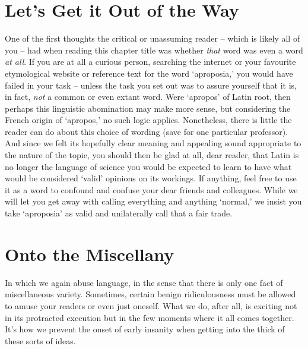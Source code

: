 \section{Let's Get it Out of the Way}
\label{sec:aproposia-is-not-a-word}
\noindent One of the first thoughts the critical or unassuming reader -- which is likely all of you -- had when reading this chapter title was whether \emph{that} word was even a word \emph{at all}. If you are at all a curious person, searching the internet or your favourite etymological website or reference text for the word `aproposia,' you would have failed in your task -- unless the task you set out was to assure yourself that it is, in fact, \emph{not} a common or even extant word. Were `apropos' of Latin root, then perhaps this linguistic abomination may make more sense, but considering the French origin of `apropos,' no such logic applies. Nonetheless, there is little the reader can do about this choice of wording (save for one particular professor). And since we felt its hopefully clear meaning and appealing sound appropriate to the nature of the topic, you should then be glad at all, dear reader, that Latin is no longer the language of science you would be expected to learn to have what would be considered `valid' opinions on its workings. If anything, feel free to use it as a word to confound and confuse your dear friends and colleagues. While we will let you get away with calling everything and anything `normal,' we insist you take `aproposia' as valid and unilaterally call that a fair trade.

\section{Onto the Miscellany}

In which we again abuse language, in the sense that there is only one fact of miscellaneous variety. Sometimes, certain benign ridiculousness must be allowed to amuse your readers or even just oneself. What we do, after all, is exciting not in its protracted execution but in the few moments where it all comes together. It's how we prevent the onset of early insanity when getting into the thick of these sorts of ideas.


